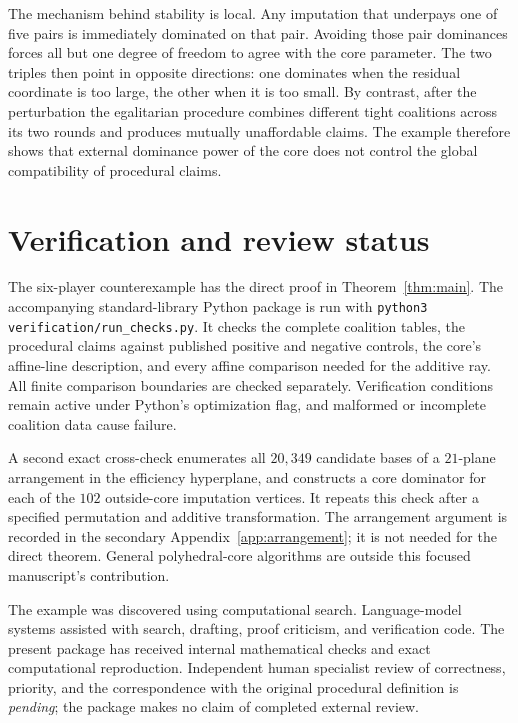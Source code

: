 \documentclass[11pt]{article}
\begin{document}
The mechanism behind stability is local. Any imputation that underpays one of
five pairs is immediately dominated on that pair. Avoiding those pair
dominances forces all but one degree of freedom to agree with the core
parameter. The two triples then point in opposite directions: one dominates
when the residual coordinate is too large, the other when it is too small.
By contrast, after the perturbation the egalitarian procedure combines
different tight coalitions across its two rounds and produces mutually
unaffordable claims. The example therefore shows that external dominance
power of the core does not control the global compatibility of procedural
claims.




\section{Verification and review status}\label{sec:methods}

The six-player counterexample has the direct proof in
Theorem~\ref{thm:main}. The accompanying standard-library Python package is
run with \texttt{python3 verification/run\_checks.py}. It checks the complete
coalition tables, the procedural claims against published positive and
negative controls, the core's affine-line description, and every affine
comparison needed for the additive ray. All finite comparison boundaries are
checked separately. Verification conditions remain active under Python's
optimization flag, and malformed or incomplete coalition data cause failure.

A second exact cross-check enumerates all $20{,}349$ candidate bases of a
$21$-plane arrangement in the efficiency hyperplane, and constructs a core
dominator for each of the $102$ outside-core imputation vertices. It repeats
this check after a specified permutation and additive transformation. The
arrangement argument is recorded in the secondary Appendix~\ref{app:arrangement};
it is not needed for the direct theorem. General polyhedral-core algorithms
are outside this focused manuscript's contribution.

The example was discovered using computational search. Language-model systems
assisted with search, drafting, proof criticism, and verification code. The
present package has received internal mathematical checks and exact
computational reproduction. Independent human specialist review of correctness,
priority, and the correspondence with the original procedural definition is
\emph{pending}; the package makes no claim of completed external review.
\end{document}
